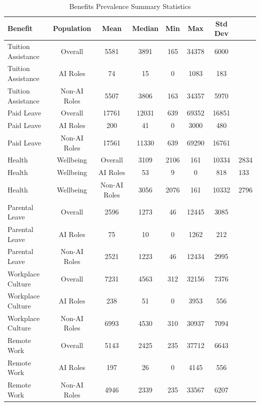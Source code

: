 \begin{table}[htbp]
\caption{Benefits Prevalence Summary Statistics}
\label{tab:benefits_summary}
\begin{tabular}{lcccccc}
\hline\hline
Benefit & Population & Mean & Median & Min & Max & Std Dev \\
\hline
Tuition Assistance & Overall & 5581 & 3891 & 165 & 34378 & 6000 \\
Tuition Assistance & AI Roles & 74 & 15 & 0 & 1083 & 183 \\
Tuition Assistance & Non-AI Roles & 5507 & 3806 & 163 & 34357 & 5970 \\
Paid Leave & Overall & 17761 & 12031 & 639 & 69352 & 16851 \\
Paid Leave & AI Roles & 200 & 41 & 0 & 3000 & 480 \\
Paid Leave & Non-AI Roles & 17561 & 11330 & 639 & 69290 & 16761 \\
Health & Wellbeing & Overall & 3109 & 2106 & 161 & 10334 & 2834 \\
Health & Wellbeing & AI Roles & 53 & 9 & 0 & 818 & 133 \\
Health & Wellbeing & Non-AI Roles & 3056 & 2076 & 161 & 10332 & 2796 \\
Parental Leave & Overall & 2596 & 1273 & 46 & 12445 & 3085 \\
Parental Leave & AI Roles & 75 & 10 & 0 & 1262 & 212 \\
Parental Leave & Non-AI Roles & 2521 & 1223 & 46 & 12434 & 2995 \\
Workplace Culture & Overall & 7231 & 4563 & 312 & 32156 & 7376 \\
Workplace Culture & AI Roles & 238 & 51 & 0 & 3953 & 556 \\
Workplace Culture & Non-AI Roles & 6993 & 4530 & 310 & 30937 & 7094 \\
Remote Work & Overall & 5143 & 2425 & 235 & 37712 & 6643 \\
Remote Work & AI Roles & 197 & 26 & 0 & 4145 & 556 \\
Remote Work & Non-AI Roles & 4946 & 2339 & 235 & 33567 & 6207 \\
\hline\hline
\end{tabular}
\end{table}

